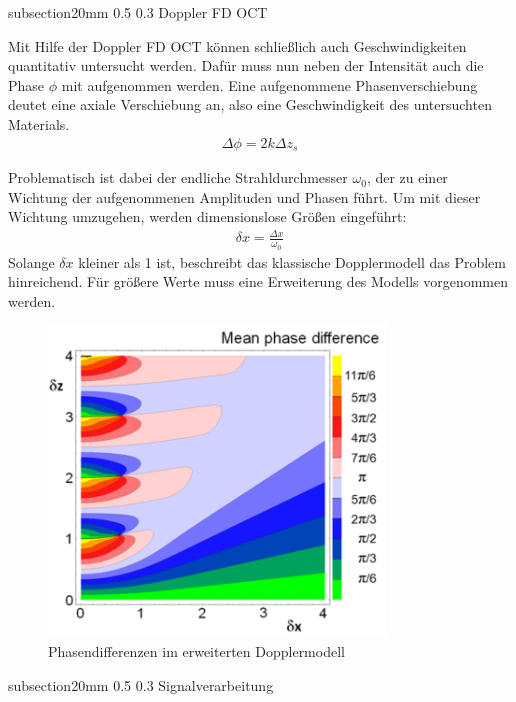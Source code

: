 \documentclass[german, %
parskip=full, %
bibliography=totoc, %
]{scrartcl}
\makeatletter
\renewcommand\subsection{\@startsection 
   {subsection}{2}{0mm}%
   {0.5\baselineskip}%
   {0.3\baselineskip}%
   {\bfseries\sffamily\large}%
   }
\makeatother
\begin{document}
\subsection{Doppler FD OCT}

Mit Hilfe der Doppler FD OCT können schließlich auch Geschwindigkeiten quantitativ untersucht werden. Dafür muss nun neben der Intensität auch die Phase $\phi$ mit aufgenommen werden. Eine aufgenommene Phasenverschiebung deutet eine axiale Verschiebung an, also eine Geschwindigkeit des untersuchten Materials.
\begin{align}
\Delta \phi = 2 k \Delta z_s
\end{align}

Problematisch ist dabei der endliche Strahldurchmesser $\omega_0$, der zu einer Wichtung der aufgenommenen Amplituden und Phasen führt. Um mit dieser Wichtung umzugehen, werden dimensionslose Größen eingeführt:
\begin{align}
\delta x = \frac{\Delta x}{\omega _0}
\end{align}
Solange $\delta x$ kleiner als 1 ist, beschreibt das klassische Dopplermodell das Problem hinreichend. Für größere Werte muss eine Erweiterung des Modells vorgenommen werden.

\begin{figure}[ht] 
  \centering
     \includegraphics[width=0.8\textwidth]{DopplerModell}
  \caption{Phasendifferenzen im erweiterten Dopplermodell	\cite{Skript}}
  \label{fig:dopplermodell}
\end{figure}

\subsection{Signalverarbeitung}
\end{document}
